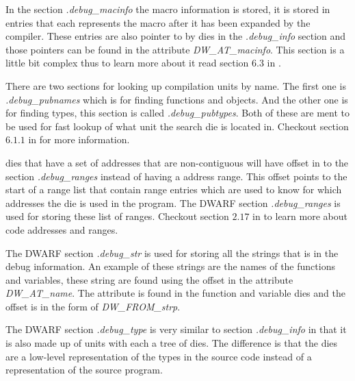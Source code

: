 In the section \emph{.debug\_macinfo} the macro information is stored, it is stored in entries that each represents the macro after it has been expanded by the compiler.
These entries are also pointer to by \glspl{die} in the \emph{.debug\_info} section and those pointers can be found in the attribute \emph{DW\_AT\_macinfo}.
This section is a little bit complex thus to learn more about it read section $6.3$ in \cite{dwarf}.


There are two sections for looking up compilation units by name.
The first one is \emph{.debug\_pubnames} which is for finding functions and objects.
And the other one is for finding types, this section is called \emph{.debug\_pubtypes}.
Both of these are ment to be used for fast lookup of what unit the search \gls{die} is located in.
Checkout section $6.1.1$ in \cite{dwarf} for more information.


\Glspl{die} that have a set of addresses that are non-contiguous will have offset in to the section \emph{.debug\_ranges} instead of having a address range.
This offset points to the start of a range list that contain range entries which are used to know for which addresses the \gls{die} is used in the program.
The \gls{DWARF} section \emph{.debug\_ranges} is used for storing these list of ranges.
Checkout section $2.17$ in \cite{dwarf} to learn more about code addresses and ranges.


The \gls{DWARF} section \emph{.debug\_str} is used for storing all the strings that is in the debug information.
An example of these strings are the names of the functions and variables, these string are found using the offset in the attribute \emph{DW\_AT\_name}.
The attribute is found in the function and variable \glspl{die} and the offset is in the form of \emph{DW\_FROM\_strp}.


The \gls{DWARF} section \emph{.debug\_type} is very similar to section \emph{.debug\_info} in that it is also made up of units with each a \gls{tree} of \glspl{die}.
The difference is that the \glspl{die} are a low-level representation of the types in the source code instead of a representation of the source program.

